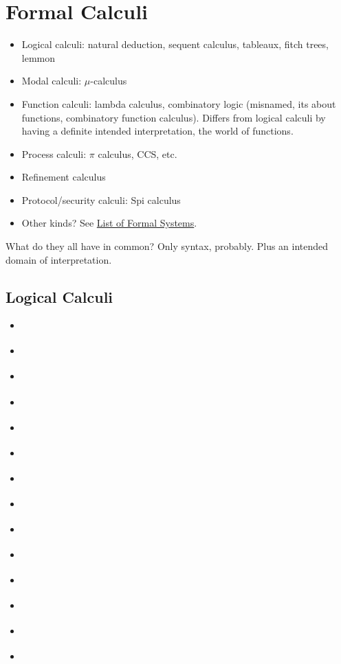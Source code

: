 \section{Formal Calculi}\label{sec:formal_calculi}

\begin{itemize}
\item Logical calculi: natural deduction, sequent calculus, tableaux, fitch trees, lemmon
\item Modal calculi: \(\mu\)-calculus
\item Function calculi: lambda calculus, combinatory logic (misnamed, its
about functions, combinatory function calculus). Differs from logical
calculi by having a definite intended interpretation, the world of
functions.
\item Process calculi: \(\pi\) calculus, CCS, etc.
\item Refinement calculus
\item Protocol/security calculi: Spi calculus
\item Other kinds?  See \href{https://en.wikipedia.org/wiki/List_of_formal_systems}{List of Formal Systems}.
\end{itemize}

What do they all have in common? Only syntax, probably. Plus an
intended domain of interpretation.

 \cite{spi_calculus}


\subsection{Logical Calculi}

\begin{itemize}
\item {} \cite{bimbo2014proof}
\item {} \cite{troelstra2000basic}
\item {} \cite{negri2008structural}
\item {} \cite{Restall2000-RESAIT-4}
\item {} \cite{takeuti2013proof}
\item {} \cite{kleene2009introduction}
\item {} \cite{Kleene1967-KLEML}
\item {} \cite{Fitch1952-FITSL}
\item {} \cite{Lemmon1965-LEMBL}
\item {} \cite{Quine1940-QUIML}
\item {} \cite{Quine1950-QUIMOL}
\item {} \cite{Church1944-CHUITM}
\item {} \cite{Gentzen1964-nat-deduc}
\item {} \cite{Gentzen1969-GENTCP}
\end{itemize}

